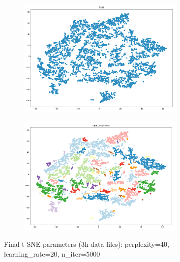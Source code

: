 \begin{figure}
  \centering
	\begin{subfigure}{.5\textwidth}
    \centering
    \includegraphics[width=0.9\textwidth]{./images/tsneParametersTest/3h-1-finalTSNE.png}
  \end{subfigure}%
  \begin{subfigure}{.5\textwidth}
    \centering
    \includegraphics[width=0.9\textwidth]{./images/tsneParametersTest/3h-1-finalTSNEDBSCAN.png}
	\end{subfigure}
	\caption{Final t-SNE parameters (3h data files): perplexity=40, learning\_rate=20, n\_iter=5000}
  \label{figure:finalTSNE3h}
\end{figure}
